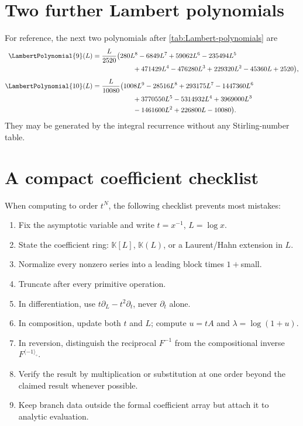 \documentclass[11pt]{article}
\theoremstyle{pltheorem}
\newcommand{\K}{\mathbb K}
\newcommand{\rev}{\langle-1\rangle_{\circ}}
\begin{document}
\appendix

\section{Two further Lambert polynomials}
\label{app:further-P}

For reference, the next two polynomials after \cref{tab:Lambert-polynomials} are
\begin{align}
 \LambertPolynomial{9}(L)={}&\frac{L}{2520}\bigl(
 280L^8-6849L^7+59062L^6-235494L^5
 \notag\\
 &\hspace{4.6em}+471429L^4-476280L^3+229320L^2-45360L+2520
 \bigr),\label{eq:P9}\\[0.4em]
 \LambertPolynomial{10}(L)={}&\frac{L}{10080}\bigl(
 1008L^9-28516L^8+293175L^7-1447360L^6
 \notag\\
 &\hspace{4.6em}+3770550L^5-5314932L^4+3969000L^3
 \notag\\
 &\hspace{4.6em}-1461600L^2+226800L-10080
 \bigr).
 \label{eq:P10}
\end{align}
They may be generated by the integral recurrence without any Stirling-number table.

\section{A compact coefficient checklist}
\label{app:checklist}

When computing to order \(t^N\), the following checklist prevents most mistakes:
\begin{enumerate}
\item Fix the asymptotic variable and write \(t=x^{-1}\), \(L=\log x\).
\item State the coefficient ring: \(\K[L]\), \(\K(L)\), or a Laurent/Hahn extension in \(L\).
\item Normalize every nonzero series into a leading block times \(1+\)small.
\item Truncate after every primitive operation.
\item In differentiation, use \(t\partial_L-t^2\partial_t\), never \(\partial_t\) alone.
\item In composition, update both \(t\) and \(L\); compute
\(u=tA\) and \(\lambda=\log(1+u)\).
\item In reversion, distinguish the reciprocal \(F^{-1}\) from the compositional inverse \(F^{\rev}\).
\item Verify the result by multiplication or substitution at one order beyond the claimed result whenever possible.
\item Keep branch data outside the formal coefficient array but attach it to analytic evaluation.
\end{enumerate}
\end{document}
